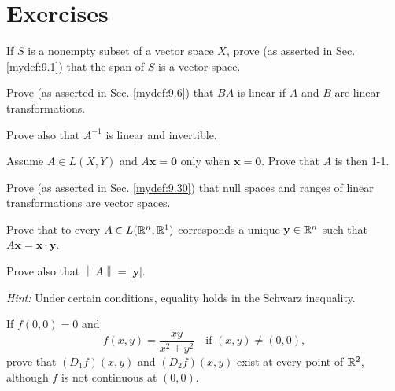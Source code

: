 
\section{Exercises}


\begin{myexercise}
    \label{ex:9.1}
    If $S$ is a nonempty subset of a vector space $X$, 
    prove (as asserted in Sec. \ref{mydef:9.1}) that
    the span of $S$ is a vector space.
\end{myexercise}


\begin{myexercise}
    \label{ex:9.2}
    Prove (as asserted in Sec. \ref{mydef:9.6}) that $BA$ is linear if $A$ and $B$ are linear transformations.
    
    Prove also that $A^{- 1}$ is linear and invertible.
\end{myexercise}


\begin{myexercise}
    \label{ex:9.3}
    Assume $A \in  L(X, Y)$ and $A\mathbf{x}= \mathbf{0}$ only when $\mathbf{x}= \mathbf{0}$. 
    Prove that $A$ is then 1-1.
\end{myexercise}


\begin{myexercise}
    \label{ex:9.4}
    Prove (as asserted in Sec. \ref{mydef:9.30}) that null spaces and ranges of linear transformations are vector spaces.
\end{myexercise}


\begin{myexercise}
    \label{ex:9.5}
    Prove that to every $A \in L({\protect\mathbb R}^n, {\protect\mathbb R}^1)$ corresponds a unique $\mathbf{y} \in {\protect\mathbb R}^n$ such that $A\mathbf{x = x \cdot y}$.
    
    Prove also that $\left\| A \right\| = \left| \mathbf{y} \right| $.

    \emph{Hint:} Under certain conditions, equality holds in the Schwarz inequality.
\end{myexercise}


\begin{myexercise}
    \label{ex:9.6}
    If $f (0, 0) = 0$ and
    \begin{equation*}
        f(x, y) = \frac{xy}{x^2 + y^2} \quad\text{if } (x, y) \neq (0, 0),
    \end{equation*}
    prove that $(D_1f)(x, y)$ and $(D_2f)(x, y)$ exist at every point of ${\protect\mathbb R}^2$, although $f$ is not continuous at $(0, 0)$.
\end{myexercise}


